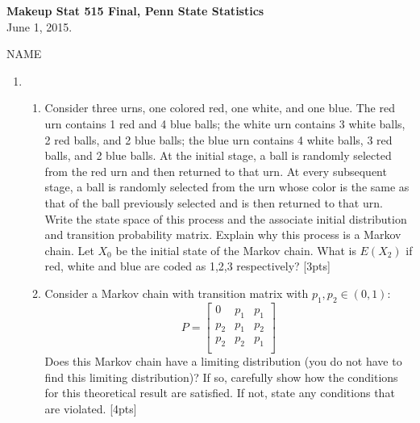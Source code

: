 \documentclass[12pt]{article}
\begin{document}
\begin{center}
{\bf Makeup Stat 515 Final, Penn State Statistics}\\ 
{June 1, 2015.}
\end{center}
\begin{flushleft}
NAME
\end{flushleft}

\begin{enumerate}

\item 
\begin{enumerate} 
\item Consider three urns, one colored red, one white, and one blue.
  The red urn contains 1 red and 4 blue balls; the white urn contains
  3 white balls, 2 red balls, and 2 blue balls; the blue urn contains
  4 white balls, 3 red balls, and 2 blue balls.  At the initial stage,
  a ball is randomly selected from the red urn and then returned to
  that urn. At every subsequent stage, a ball is randomly selected
  from the urn whose color is the same as that of the ball previously
  selected and is then returned to that urn. 
 Write the state space of this process and the associate initial
  distribution and transition probability matrix. Explain why this
  process is a Markov chain. Let $X_0$ be the initial
  state of the Markov chain. What is $E(X_2)$ if red, white and blue
  are coded as 1,2,3 respectively? [3pts]
\item Consider a Markov chain with transition matrix with $p_1,p_2 \in (0,1)$:
\begin{equation*}
  P=
  \begin{bmatrix}
    0 & p_1 & p_1\\
    p_2 & p_1 & p_2 \\
    p_2 & p_2 & p_1 \\
  \end{bmatrix}
\end{equation*}
Does this Markov chain have a limiting distribution (you do not have
to find this limiting distribution)? If so, carefully show how the conditions for this
theoretical result are satisfied.  If not, state any conditions that
are violated. [4pts]
\end{enumerate}

\end{enumerate}
\end{document}
